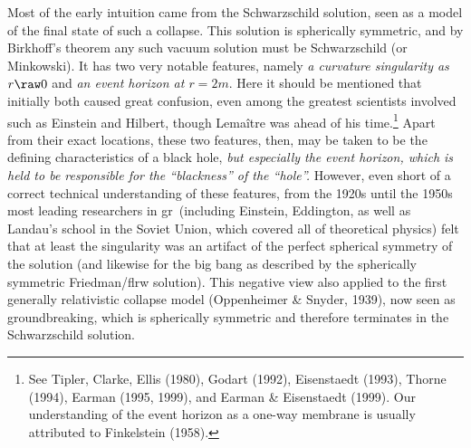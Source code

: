 \documentclass[11pt,a4paper]{article}
\newcommand{\GR}{{\sc gr}}
\begin{document}
 Most of the early intuition came from the Schwarzschild solution, seen as a  model of the final state of such a collapse. This solution is spherically symmetric, and by Birkhoff's theorem any such vacuum solution must be Schwarzschild (or Minkowski). It has
 two very notable features, namely \emph{a curvature singularity as $r\raw 0$} and \emph{an event horizon at $r=2m$}.
Here it should be mentioned that  initially both  caused great confusion, even among the greatest scientists involved such as Einstein and Hilbert, though  Lema\^{i}tre was ahead of his time.\footnote{See Tipler, Clarke, Ellis (1980),  Godart (1992),
 Eisenstaedt (1993), Thorne (1994), Earman (1995, 1999),  and Earman \& Eisenstaedt (1999). Our understanding of the event horizon as a one-way membrane is usually attributed to Finkelstein (1958).}  Apart from their exact locations, these two features, then, may be taken to be the defining characteristics of a black hole, \emph{but especially the event horizon, which is held to be responsible for the ``blackness'' of the ``hole''.} 
 However, even short of a correct technical understanding of these features,
 from the 1920s until the 1950s most leading researchers in \GR\ (including Einstein, Eddington, as well as Landau's school in the Soviet Union, which covered all of theoretical physics) felt that at least the singularity was an artifact of the perfect spherical symmetry of the solution (and likewise for the big bang as described by the spherically symmetric Friedman/{\sc flrw} solution). This negative view also applied to the 
first  generally relativistic collapse model (Oppenheimer \& Snyder, 1939), now seen as groundbreaking, which is spherically  symmetric and therefore terminates in the Schwarzschild solution.
\end{document}
